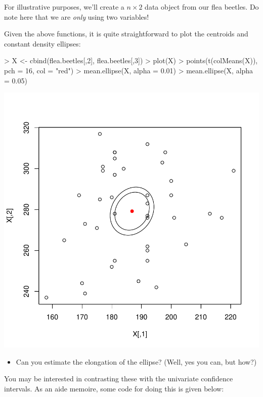 \documentclass[11pt]{article}
\begin{document}



For illustrative purposes, we'll create a $n \times 2$ data object from our flea beetles.   Do note here that we are \emph{only} using two variables!



Given the above functions, it is quite straightforward to plot the centroids and constant density ellipses:

\begin{Schunk}
\begin{Sinput}
> X <- cbind(flea.beetles[,2], flea.beetles[,3])
> plot(X)
> points(t(colMeans(X)), pch = 16, col = "red")
> mean.ellipse(X, alpha = 0.01)
> mean.ellipse(X, alpha = 0.05)
\end{Sinput}
\end{Schunk}
\includegraphics{STAT3401Week7HotellingLab-plotellipse}

\begin{itemize}
\item Can you estimate the elongation of the ellipse? (Well, yes you can, but how?)
\end{itemize}

You may be interested in contrasting these with the univariate confidence intervals.   As an aide memoire, some code for doing this is given below:
\end{document}
